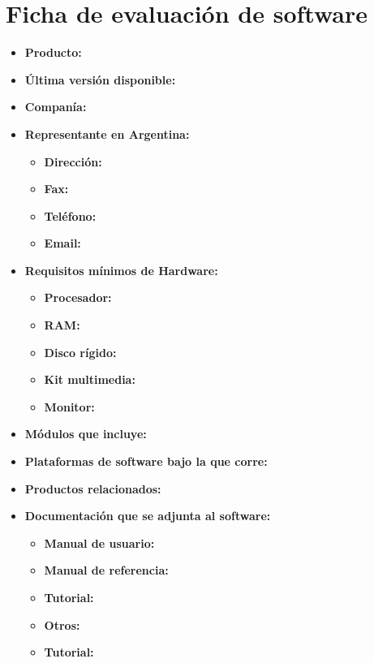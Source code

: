 \section{Ficha de evaluación de software}

\begin{itemize}
  \item \textbf{Producto:}
  \item \textbf{Última versión disponible:}
  \item \textbf{Companía:}

  \item \textbf{Representante en Argentina:}
    \begin{itemize}
      \item \textbf{Dirección:}
      \item \textbf{Fax:}
      \item \textbf{Teléfono:}
      \item \textbf{Email:}
    \end{itemize}

  \item \textbf{Requisitos mínimos de Hardware:}
    \begin{itemize}
      \item \textbf{Procesador:}
      \item \textbf{RAM:}
      \item \textbf{Disco rígido:}
      \item \textbf{Kit multimedia:}
      \item \textbf{Monitor:}
    \end{itemize}

    \item \textbf{Módulos que incluye:}
    \item \textbf{Plataformas de software bajo la que corre:}
    \item \textbf{Productos relacionados:}

    \item \textbf{Documentación que se adjunta al software:}
      \begin{itemize}
        \item \textbf{Manual de usuario:}
        \item \textbf{Manual de referencia:}
        \item \textbf{Tutorial:}
        \item \textbf{Otros:}
        \item \textbf{Tutorial:}
      \end{itemize}


\end{itemize}
